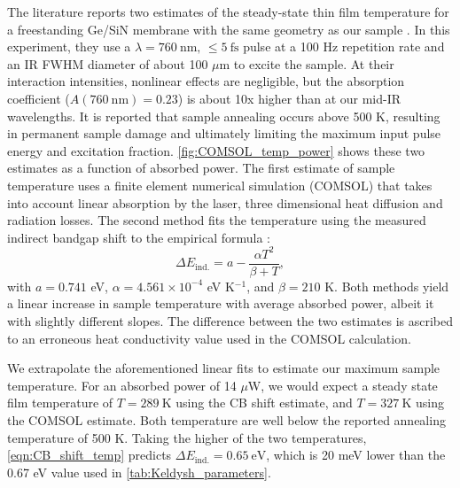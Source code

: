 The literature reports two estimates of the steady-state thin film temperature for a freestanding Ge/SiN membrane with the same geometry as our sample \cite{zurchDirectSimultaneousObservation2017}. In this experiment, they use a $\lambda=760 \ \textrm{nm,}$ $\le5 \ \textrm{fs}$ pulse at a 100 Hz repetition rate and an IR FWHM diameter of about 100 $\mu$m to excite the sample. At their interaction intensities, nonlinear effects are negligible, but the absorption coefficient ($A (760 \ \textrm{nm}) = 0.23$) is about 10x higher than at our mid-IR wavelengths. It is reported that sample annealing occurs above 500 K, resulting in permanent sample damage and ultimately limiting the maximum input pulse energy and excitation fraction. \cref{fig:COMSOL_temp_power} shows these two estimates as a function of absorbed power. The first estimate of sample temperature uses a finite element numerical simulation (COMSOL) that takes into account linear absorption by the laser, three dimensional heat diffusion and radiation losses. The second method fits the temperature using the measured indirect bandgap shift to the empirical formula \cite{vinaTemperatureDependenceDielectric1984}:
\begin{equation}
\Delta E_{\textrm{ind.}} = a - \frac{\alpha T^2}{\beta + T},
\label{eqn:CB_shift_temp}
\end{equation}
with $a = 0.741$ eV, $\alpha=4.561 \times 10^{-4}$ eV K$^{-1}$, and $\beta = 210$ K. Both methods yield a linear increase in sample temperature with average absorbed power, albeit it with slightly different slopes. The difference between the two estimates is ascribed to an erroneous heat conductivity value used in the COMSOL calculation.

We extrapolate the aforementioned linear fits to estimate our maximum sample temperature. For an absorbed power of 14 $\mu$W, we would expect a steady state film temperature of $T = 289 \ \textrm{K}$ using the CB shift estimate, and $T = 327 \ \textrm{K}$ using the COMSOL estimate. Both temperature are well below the reported annealing temperature of 500 K. Taking the higher of the two temperatures, \cref{eqn:CB_shift_temp} predicts $\Delta E_{\textrm{ind.}} = 0.65 \ \textrm{eV}$, which is 20 meV lower than the 0.67 eV value used in \cref{tab:Keldysh_parameters}.


